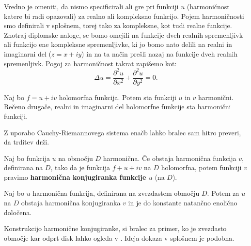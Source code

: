 \documentclass[mat1]{fmfdelo}
\begin{document}
    \begin{opomba}
        Vredno je omeniti, da nismo specificirali ali gre pri funkciji $u$ (harmoničnost katere bi radi opazovali) za realno ali kompleksno funkcijo. 
        Pojem harmoničnosti smo definirali v splošnem, torej tako za kompleksne, kot tudi realne funkcije.
        Znotraj diplomske naloge, se bomo omejili na funkcije dveh realnih spremenljivk ali funkcijo ene kompleksne spremenljivke, ki jo bomo nato delili na realni in imaginarni del ($z = x + iy $) in na ta način prešli nazaj na funkcije dveh realnih spremenljivk.
        \newline
        Pogoj za harmoničnost takrat zapišemo kot: 
            $$
                \Delta u = \frac{\partial^2 u}{\partial x ^ 2} +  \frac{\partial^2 u}{\partial y ^ 2}= 0.
            $$
    \end{opomba}
    \begin{trditev}
        \label{hh}
        Naj bo $f = u + iv$ holomorfna funkcija. Potem sta funkciji $u$ in $v$ harmonični. Rečeno drugače, realni in imaginarni del holomorfne funkcije sta harmonični funkciji. 
    \end{trditev}
    \begin{dokaz}
        Z uporabo Cauchy-Riemannovega sistema enačb lahko bralec sam hitro preveri, da trditev drži.
    \end{dokaz}

    \begin{definicija}
        Naj bo funkcija $u$ na območju $D$ harmonična. Če obstaja harmonična funkcija $v$, definirana na $D$, tako da je funkcija $f + u + iv$ na $D$ holomorfna, potem funkciji $v$ pravimo \textbf{harmonična konjugiranka funkcije $u$} (na $D$).    
    \end{definicija}

    \begin{trditev}
        \label{konj}
        Naj bo $u$ harmonična funkcija, definirana na zvezdastem območju $D$. Potem za $u$ na $D$ obstaja harmonična konjugiranka $v$ in je do konstante natančno enolično določena. 
    \end{trditev}
    \begin{dokaz}
        Konstrukcijo harmonične konjugiranke, si bralec za primer, ko je zvezdasto območje kar odprt disk lahko ogleda v \cite{osnova}. 
        Ideja dokaza v splošnem je podobna. 
    \end{dokaz}
\end{document}
